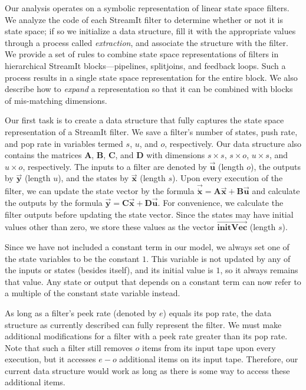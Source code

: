 \label{sec:statespace}

Our analysis operates on a symbolic representation of linear state
space filters.  We analyze the code of each StreamIt filter to
determine whether or not it is state space; if so we initialize a data
structure, fill it with the appropriate values through a process
called \emph{extraction}, and associate the structure with the filter.
We provide a set of rules to combine state space representations of
filters in hierarchical StreamIt blocks---pipelines, splitjoins, and
feedback loops. Such a process results in a single state space
representation for the entire block.  We also describe how to
\emph{expand} a representation so that it can be combined with blocks
of mis-matching dimensions.


Our first task is to create a data structure that fully captures the
state space representation of a StreamIt filter.  We save a filter's
number of states, push rate, and pop rate in variables termed $s$,
$u$, and $o$, respectively. Our data structure also contains the
matrices $\mathbf{A}$, $\mathbf{B}$, $\mathbf{C}$, and $\mathbf{D}$
with dimensions $s \times s$, $s
\times o$, $u \times s$, and $u \times o$, respectively. The
inputs to a filter are denoted by $\vec{\mathbf{u}}$ (length $o$), the
outputs by $\vec{\mathbf{y}}$ (length $u$), and the states by
$\vec{\mathbf{x}}$ (length $s$). Upon every execution of the filter,
we can update the state vector by the
formula $\vec{\dot{\mathbf{x}}} = \mathbf{A}\vec{\mathbf{x}} +
\mathbf{B}\vec{\mathbf{u}}$ and calculate the outputs by the formula $\vec{\mathbf{y}} =
\mathbf{C}\vec{\mathbf{x}} +
\mathbf{D}\vec{\mathbf{u}}$.  For convenience, we calculate the filter 
outputs before updating the
state vector. Since the states may have initial values other than
zero, we store these values as the vector
$\overrightarrow{\mathbf{initVec}}$ (length $s$).

Since we have not included a constant term in our model, we always set
one of the state variables to be the constant $1$. This variable is
not updated by any of the inputs or states (besides itself), and its
initial value is $1$, so it always remains that value. Any state or
output that depends on a constant term can now refer to a multiple of
the constant state variable instead.

As long as a filter's peek rate (denoted by $e$) equals its pop rate,
the data structure as currently described can fully represent the
filter. We must make additional modifications for a filter with a peek
rate greater than its pop rate. Note that such a filter still removes
$o$ items from its input tape upon every execution, but it accesses
$e-o$ additional items on its input tape. Therefore, our current data
structure would work as long as there is some way to access these
additional items.

